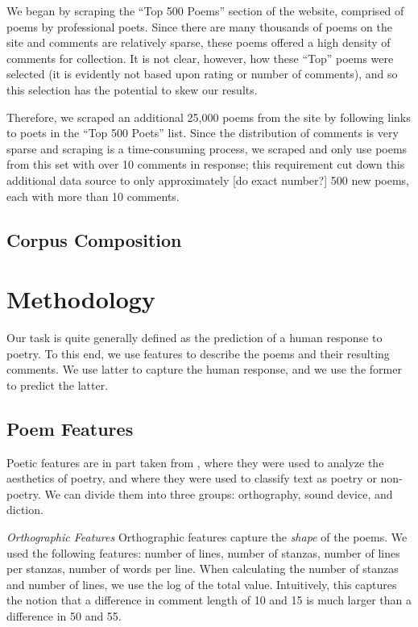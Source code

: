 \documentclass[11pt]{article}
\begin{document}
We began by scraping the ``Top 500 Poems'' section of the website, comprised of poems by professional poets. Since there are many thousands of poems on the site and comments are relatively sparse, these poems offered a high density of comments for collection. It is not clear, however, how these ``Top'' poems were selected (it is evidently not based upon rating or number of comments), and so this selection has the potential to skew our results.

Therefore, we scraped an additional 25,000 poems from the site by following links to poets in the ``Top 500 Poets'' list. Since the distribution of comments is very sparse and scraping is a time-consuming process, we scraped and only use poems from this set with over 10 comments in response; this requirement cut down this additional data source to only approximately [do exact number?] 500 new poems, each with more than 10 comments.

\subsection*{Corpus Composition}

\section{Methodology}
Our task is quite generally defined as the prediction of a human response to poetry. To this end, we use features to describe the poems and their resulting comments. We use latter to capture the human response, and we use the former to predict the latter.

\subsection*{Poem Features}
Poetic features are in part taken from , where they were used to analyze the aesthetics of poetry, and  where they were used to classify text as poetry or non-poetry. We can divide them into three groups: orthography, sound device, and diction.

\emph{Orthographic Features}
Orthographic features capture the \emph{shape} of the poems. We used the following features: number of lines, number of stanzas, number of lines per stanzas, number of words per line. When calculating the number of stanzas and number of lines, we use the log of the total value. Intuitively, this captures the notion that a difference in comment length of 10 and 15 is much larger than a difference in 50 and 55.
\end{document}
